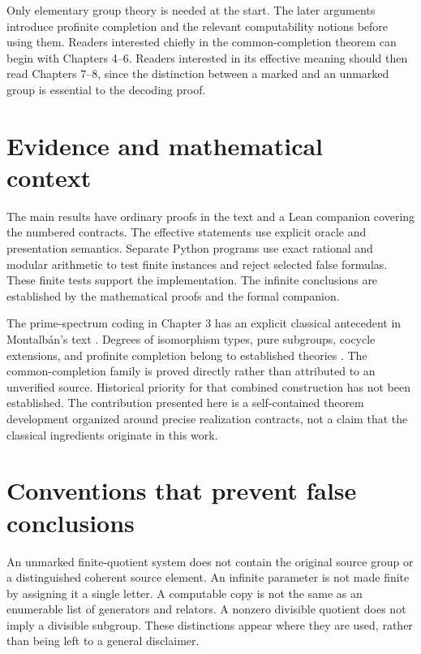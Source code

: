 Only elementary group theory is needed at the start. The later arguments introduce profinite completion and the relevant computability notions before using them. Readers interested chiefly in the common-completion theorem can begin with Chapters 4--6. Readers interested in its effective meaning should then read Chapters 7--8, since the distinction between a marked and an unmarked group is essential to the decoding proof.

\section*{Evidence and mathematical context}
The main results have ordinary proofs in the text and a Lean companion covering the numbered contracts. The effective statements use explicit oracle and presentation semantics. Separate Python programs use exact rational and modular arithmetic to test finite instances and reject selected false formulas. These finite tests support the implementation. The infinite conclusions are established by the mathematical proofs and the formal companion.

The prime-spectrum coding in Chapter 3 has an explicit classical antecedent in Montalb\'an's text \cite{Montalban}. Degrees of isomorphism types, pure subgroups, cocycle extensions, and profinite completion belong to established theories \cite{Calvert,Fuchs,Lupini,Wilkes}. The common-completion family is proved directly rather than attributed to an unverified source. Historical priority for that combined construction has not been established. The contribution presented here is a self-contained theorem development organized around precise realization contracts, not a claim that the classical ingredients originate in this work.

\section*{Conventions that prevent false conclusions}
An unmarked finite-quotient system does not contain the original source group or a distinguished coherent source element. An infinite parameter is not made finite by assigning it a single letter. A computable copy is not the same as an enumerable list of generators and relators. A nonzero divisible quotient does not imply a divisible subgroup. These distinctions appear where they are used, rather than being left to a general disclaimer.
